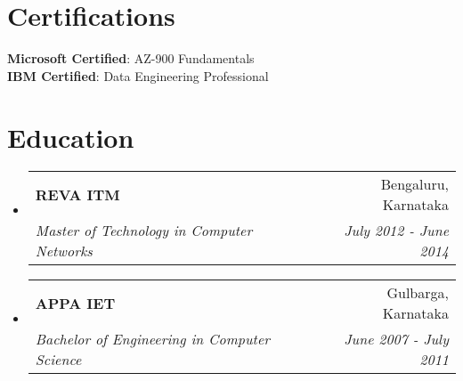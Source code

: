 \documentclass[letterpaper,11pt]{article}
\makeatletter
\newcommand{\resumeSubheading}[4]{
  \vspace{-2pt}\item
    \begin{tabular*}{0.97\textwidth}[t]{l@{\extracolsep{\fill}}r}
      \textbf{#1} & #2 \\
      \textit{\small#3} & \textit{\small #4} \\
    \end{tabular*}\vspace{-7pt}
}
\newcommand{\resumeSubHeadingListStart}{\begin{itemize}[leftmargin=0.15in, label={}]}
\newcommand{\resumeSubHeadingListEnd}{\end{itemize}}
\makeatother
\begin{document}
\section{Certifications}
 \begin{itemize}[leftmargin=0.15in, label={}]
    \small{\item{
     \textbf{Microsoft Certified}{:\hspace{0.06cm}  AZ-900 Fundamentals} \\
     \textbf{IBM Certified}{:\hspace{0.49cm}     Data Engineering Professional} \\   
      }}
 \end{itemize}

\section{Education}
  \resumeSubHeadingListStart
    \resumeSubheading
      {REVA ITM}{Bengaluru, Karnataka}
      {Master of Technology in Computer Networks}{July 2012 - June 2014}
      \resumeSubheading
      {APPA IET}{Gulbarga, Karnataka}
      {Bachelor of Engineering in Computer Science}{June 2007 - July 2011}
    
  \resumeSubHeadingListEnd



%
\end{document}
